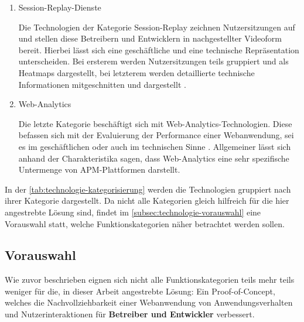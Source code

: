 \begin{enumerate}
	\item Session-Replay-Dienste
	\par Die Technologien der Kategorie Session-Replay zeichnen Nutzersitzungen auf und stellen diese Betreibern und Entwicklern in nachgestellter Videoform bereit. Hierbei lässt sich eine geschäftliche und eine technische Repräsentation unterscheiden. Bei ersterem werden Nutzersitzungen teils gruppiert und als Heatmaps dargestellt, bei letzterem werden detaillierte technische Informationen mitgeschnitten und dargestellt \cite{Webalyt}.
	
	\item Web-Analytics
	\par Die letzte Kategorie beschäftigt sich mit Web-Analytics-Technologien. Diese befassen sich mit der Evaluierung der Performance einer Webanwendung, sei es im geschäftlichen oder auch im technischen Sinne \cite{APracticalEvaluationOfWebAnalytics} \cite{WebAnalyticsAnHourADay}. Allgemeiner lässt sich anhand der Charakteristika sagen, dass Web-Analytics eine sehr spezifische Untermenge von APM-Plattformen darstellt.
	
\end{enumerate}

In der \autoref{tab:technologie-kategorisierung} werden die Technologien gruppiert nach ihrer Kategorie dargestellt. Da nicht alle Kategorien gleich hilfreich für die hier angestrebte Lösung sind, findet im \autoref{subsec:technologie-vorauswahl} eine Vorauswahl statt, welche Funktionskategorien näher betrachtet werden sollen.



\subsection{Vorauswahl}
\label{subsec:technologie-vorauswahl}

Wie zuvor beschrieben eignen sich nicht alle Funktionskategorien teils mehr teils weniger für die, in dieser Arbeit angestrebte Lösung: Ein Proof-of-Concept, welches die Nachvollziehbarkeit einer Webanwendung von Anwendungsverhalten und Nutzerinteraktionen für \textbf{Betreiber und Entwickler} verbessert.

